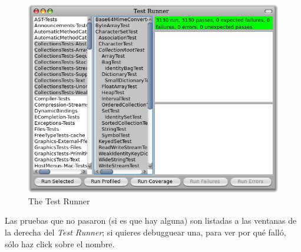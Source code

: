 \documentclass[a4paper,10pt,twoside]{book}
\begin{document}
\begin{figure}[tbh]
  \begin{center}
	\includegraphics[width=\linewidth]{test-runner}
	\caption{The \pharo \sunit Test Runner}
  \end{center}
\end{figure}





Las pruebas que no pasaron (si es que hay alguna) son listadas a las ventanas de la derecha del \emph{Test Runner};
si quieres debugguear una, para ver por qu\'e fall\'o, s\'olo haz click sobre el nombre.
\end{document}
